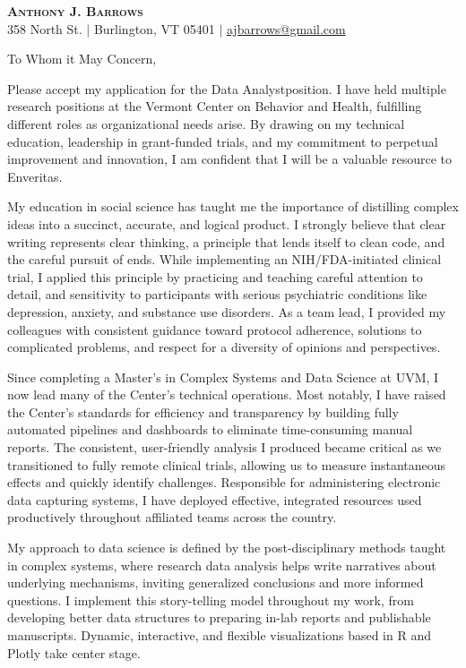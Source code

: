 \documentclass[letterpaper,11pt]{article}
\newcommand{\company}{Enveritas}
\newcommand{\position}{Data Analyst}
\begin{document}
\begin{center}
    \textbf{\Huge \scshape Anthony J. Barrows} \\ \vspace{3pt}
    \small 358 North St. $|$
    \small Burlington, VT 05401 $|$
    \href{mailto:ajbarrows@gmail.com}{ajbarrows@gmail.com}
\end{center}
\vspace{5mm}
	
	To Whom it May Concern,
	\vspace{3mm}
	
	Please accept my application for the \position \space position. I have held multiple research positions at the Vermont Center on Behavior and Health, fulfilling different roles as organizational needs arise. By drawing on my technical education, leadership in grant-funded trials, and my commitment to perpetual improvement and innovation, I am confident that I will be a valuable resource to \company.
	
	
	My education in social science has taught me the importance of distilling complex ideas into a succinct, accurate, and logical product. I strongly believe that clear writing represents clear thinking, a principle that lends itself to clean code, and the careful pursuit of ends. While implementing an NIH/FDA-initiated clinical trial, I applied this principle by practicing and teaching careful attention to detail, and sensitivity to participants with serious psychiatric conditions like depression, anxiety, and substance use disorders. As a team lead, I provided my colleagues with consistent guidance toward protocol adherence, solutions to complicated problems, and respect for a diversity of opinions and perspectives.
	
	
	Since completing a Master's in Complex Systems and Data Science at UVM, I now lead many of the Center's technical operations. Most notably, I have raised the Center’s standards for efficiency and transparency by building fully automated pipelines and dashboards to eliminate time-consuming manual reports. The consistent, user-friendly analysis I produced became critical as we transitioned to fully remote clinical trials, allowing us to measure instantaneous effects and quickly identify challenges. Responsible for administering electronic data capturing systems, I have deployed effective, integrated resources used productively throughout affiliated teams across the country.
	
	My approach to data science is defined by the post-disciplinary methods taught in complex systems, where research data analysis helps write narratives about underlying mechanisms, inviting generalized conclusions and more informed questions. I implement this story-telling model throughout my work, from developing better data structures to preparing in-lab reports and publishable manuscripts. Dynamic, interactive, and flexible visualizations based in R and Plotly take center stage. 
	
\end{document}
